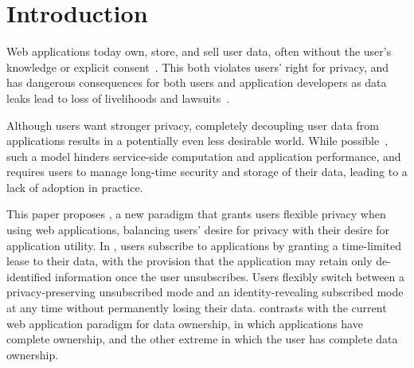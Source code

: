 \section{Introduction}
%
%
Web applications today own, store, and sell user data, often without the user's knowledge or
explicit consent~\cite{nytimes:fb, npr:data}. This both violates users' right for privacy, and has
dangerous consequences for both users and application developers as data leaks lead to loss of
livelihoods and lawsuits~\cite{breach:amazon,breach:twitter, breach:fb, breach:marriott,
breach:quora}. 

Although users want stronger privacy, completely decoupling user data from applications results in a
potentially even less desirable world. While possible~\cite{solid, amber, w5, blockstack, bstore}, such a
model hinders service-side computation and application performance, and requires users to manage
long-time security and storage of their data, leading to a lack of adoption in practice.  

This paper proposes \name, a new paradigm that grants users flexible privacy when using web
applications, balancing users' desire for privacy with their desire for application utility. In
\name, users subscribe to applications by granting a time-limited lease to their data, with the
provision that the application may retain only de-identified information once the user unsubscribes.
Users flexibly switch between a privacy-preserving unsubscribed mode and an identity-revealing
subscribed mode at any time without permanently losing their data. \name contrasts
with the current web application paradigm for data ownership, in which applications have complete
ownership, and the other extreme in which the user has complete data ownership.%

